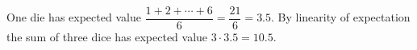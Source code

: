 One die has expected value $\dfrac{1+2+\cdots+6}{6}=\dfrac{21}{6}=3.5$. By linearity of expectation the sum of three dice has expected value $3\cdot3.5=\boxed{10.5}$.
